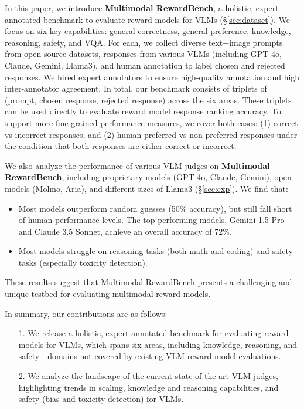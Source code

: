 In this paper, we introduce \textbf{Multimodal RewardBench}, a holistic, expert-annotated benchmark to evaluate reward models for VLMs (\S \ref{sec:dataset}). 
We focus on six key capabilities: general correctness, general preference, knowledge, reasoning, safety, and VQA. 
For each, we collect diverse text+image prompts from open-source datasets, responses from various VLMs (including GPT-4o, Claude, Gemini, Llama3), and human annotation to label chosen and rejected responses. We hired expert annotators to ensure high-quality annotation and high inter-annotator agreement. 
In total, our benchmark consists of \totalsamples triplets of (prompt, chosen response, rejected response) across the six areas. 
These triplets can be used directly to evaluate reward model response ranking accuracy. To support more fine grained performance measures, we cover both cases: (1) correct vs incorrect responses, and (2) human-preferred vs non-preferred responses under the condition that both responses are either correct or incorrect. 

We also analyze the performance of various VLM judges on \textbf{Multimodal RewardBench}, including proprietary models (GPT-4o, Claude, Gemini), open models (Molmo, Aria), and different sizes of Llama3 (\S \ref{sec:exp}). We find that:
\begin{itemize}
\setlength{\leftskip}{-0mm}
    \item Most models outperform random guesses (50\% accuracy), but still fall short of human performance levels. The top-performing models, Gemini 1.5 Pro and Claude 3.5 Sonnet, achieve an overall accuracy of 72\%.
    \item Most models struggle on reasoning tasks (both math and coding) and safety tasks (especially toxicity detection).
\end{itemize}
These results suggest that Multimodal RewardBench presents a challenging and unique testbed for evaluating multimodal reward models.
 
In summary, our contributions are as follows:
\begin{itemize}
\setlength{\leftskip}{-0mm}
    \item[1.] We release a holistic, expert-annotated benchmark for evaluating reward models for VLMs, which spans six areas, including knowledge, reasoning, and safety—domains not covered by existing VLM reward model evaluations.
    \item[2.] We analyze the landscape of the current state-of-the-art VLM judges, highlighting trends in scaling, knowledge and reasoning capabilities, and safety (bias and toxicity detection) for VLMs.
\end{itemize}
